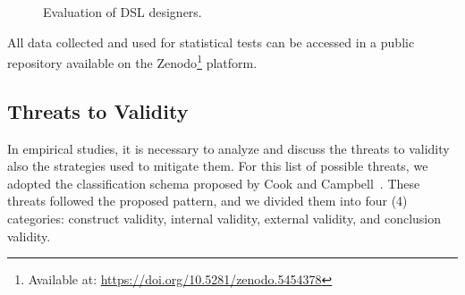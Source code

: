 \begin{figure}[!htb]
    \centering
    \caption{Evaluation of DSL designers.}
    \label{fig:inst4GERALExp}
    
\end{figure}

All data collected and used for statistical tests can be accessed in a public repository available on the Zenodo\footnote{Available at: \url{https://doi.org/10.5281/zenodo.5454378}} platform.

\subsection{Threats to Validity}
\label{ssec_experiments:preliminary_threats}

In empirical studies, it is necessary to analyze and discuss the threats to validity also the strategies used to mitigate them.
For this list of possible threats, we adopted the classification schema proposed by Cook and Campbell~\cite{Cook:1979}.
These threats followed the proposed pattern, and we divided them into four (4) categories: construct validity, internal validity, external validity, and conclusion validity.

